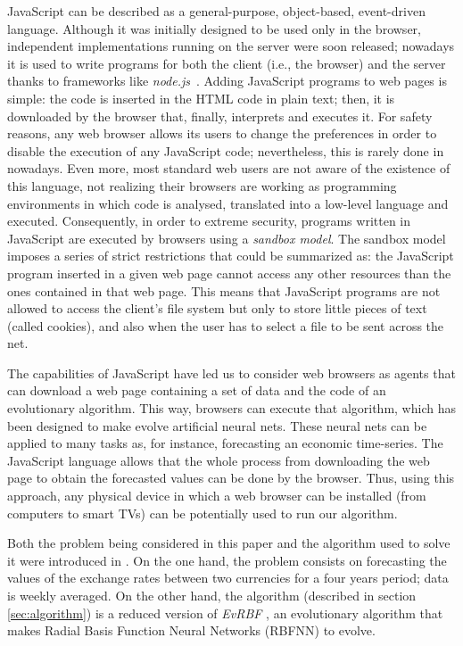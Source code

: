 \documentclass{article}
\begin{document}
JavaScript can be described as a general-purpose, object-based,
event-driven language. Although it was initially designed to be used only in the
browser, independent implementations running on the server were soon released; nowadays
it is used to write programs for both the client (i.e., the browser) and the
server thanks to frameworks like
\emph{node.js}~\cite{rauch2012smashing}.
Adding JavaScript programs to web pages is simple: the code is inserted in the HTML code in plain text; then, it is downloaded by the browser that, finally,  interprets and executes it.
For safety reasons, any web browser allows its users to change the preferences
in order to disable the execution of any JavaScript code; nevertheless, this is
rarely done in nowadays. Even more, most standard web users are not
aware of the existence of this language, not realizing their browsers
are working as programming environments in which code is analysed,
translated into a low-level language and executed. Consequently, in order to extreme security, programs written in JavaScript are executed by
browsers using a {\em sandbox model}. The sandbox model imposes a series of strict
restrictions that could be summarized as: the JavaScript program
inserted in a given web page cannot access any other resources than
the ones contained in that web page. This means that JavaScript programs are not allowed
to access the client's file system but only to store little pieces of text (called
cookies), and also when the user has to select a file to be sent
across the net.

The capabilities of JavaScript have led us to consider web browsers as agents that can download a web page containing a set
of data and the code of an evolutionary algorithm. This way, browsers can execute that algorithm, which has been designed to make evolve artificial neural nets. These neural nets can be applied to many tasks as, for instance, forecasting an economic time-series. The JavaScript language allows that the whole process from downloading the web page to obtain the forecasted values can be done by the browser. Thus, using
this approach, any physical device in which a web browser can be installed (from
computers to smart TVs) can be potentially used to run our algorithm.

Both the problem being considered in this paper and the algorithm used
to solve it were introduced in \cite{rivas03:EvRBF}. On the one hand,
the problem consists on forecasting the values of the exchange rates
between two currencies for a four years period; data is weekly averaged. %
On the other hand, the algorithm (described in
section \ref{sec:algorithm}) is a reduced version of {\em EvRBF}
\cite{rivas03:EvRBF}, an evolutionary algorithm that makes Radial Basis
Function Neural Networks (RBFNN) to evolve.
\end{document}
